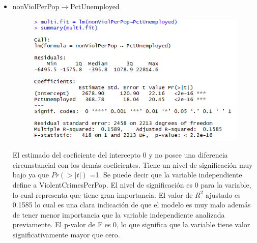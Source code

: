 \documentclass[a4paper,10pt,twocolumn]{article}
\begin{document}
\begin{itemize}
	\item{nonViolPerPop$\rightarrow$PctUnemployed}




		\begin{figure}[H]
			\begin{center}
				\includegraphics[width=.92\columnwidth,right]{figures/multifit8.png}
			\end{center}
		\end{figure}

	El estimado del coeficiente del intercepto 0 y no posee una diferencia circunstancial con los demás coeficientes. Tiene un nivel de significación muy bajo ya que $Pr(> | t | )$ =1.
	Se puede decir que la variable independiente define a ViolentCrimesPerPop. El nivel de significación es 0 para la variable, lo cual representa que tiene gran importancia. El valor de $R^2$ ajustado es 0.1585 lo cual es una clara indicación de que el modelo es muy malo además de tener menor importancia que la variable independiente analizada previamente. El p-valor de F es 0, lo que significa que la variable tiene valor significativamente mayor que cero.

\end{itemize}
\end{document}
